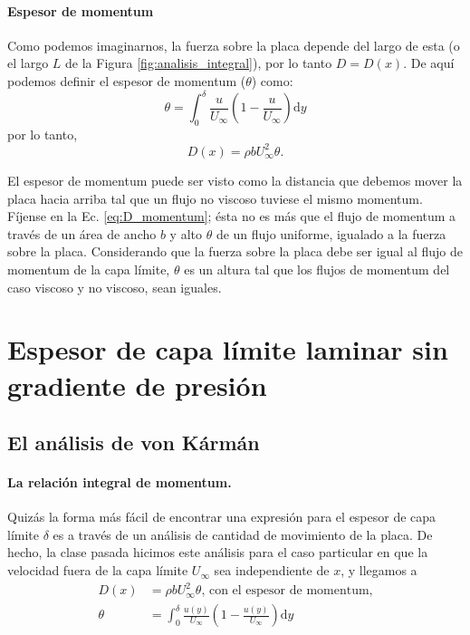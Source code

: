 \paragraph*{Espesor de momentum}
Como podemos imaginarnos, la fuerza sobre la placa depende del largo de esta (o el largo $L$ de la Figura \ref{fig:analisis_integral}), por lo tanto $D=D(x)$.
De aquí podemos definir el espesor de momentum ($\theta$) como:
%
\begin{equation}\label{eq:espesor_momentum}
\theta = \int_0^\delta \frac{u}{U_\infty}\left(1-\frac{u}{U_\infty}\right)\mathrm{d}y
\end{equation}
%
por lo tanto,
%
\begin{equation}\label{eq:D_momentum}
D(x) = \rho b U_\infty^2\theta.
\end{equation}

El espesor de momentum puede ser visto como la distancia que debemos mover la placa hacia arriba tal que un flujo no viscoso tuviese el mismo momentum.
Fíjense en la Ec. \eqref{eq:D_momentum}; ésta no es más que el flujo de momentum a través de un área de ancho $b$ y alto $\theta$ de un flujo uniforme, igualado a la fuerza sobre la placa.
Considerando que la fuerza sobre la placa debe ser igual al flujo de momentum de la capa límite, $\theta$ es un altura tal que los flujos de momentum del caso viscoso y no viscoso, sean iguales.

\section*{Espesor de capa límite laminar sin gradiente de presión}

\subsection*{El análisis de von Kármán}
\paragraph*{La relación integral de momentum.}

Quizás la forma más fácil de encontrar una expresión para el espesor de capa límite $\delta$ es a través de un análisis de cantidad de movimiento de la placa.
De hecho, la clase pasada hicimos este análisis para el caso particular en que la velocidad fuera de la capa límite $U_\infty$ sea independiente de $x$, y llegamos a
%
\begin{align}
D(x) &= \rho bU_\infty^2\theta\text{, con el espesor de momentum,}\nonumber\\
\theta &= \int_0^\delta\frac{u(y)}{U_\infty}\left(1-\frac{u(y)}{U_\infty}\right)\mathrm{d}y
\end{align}

